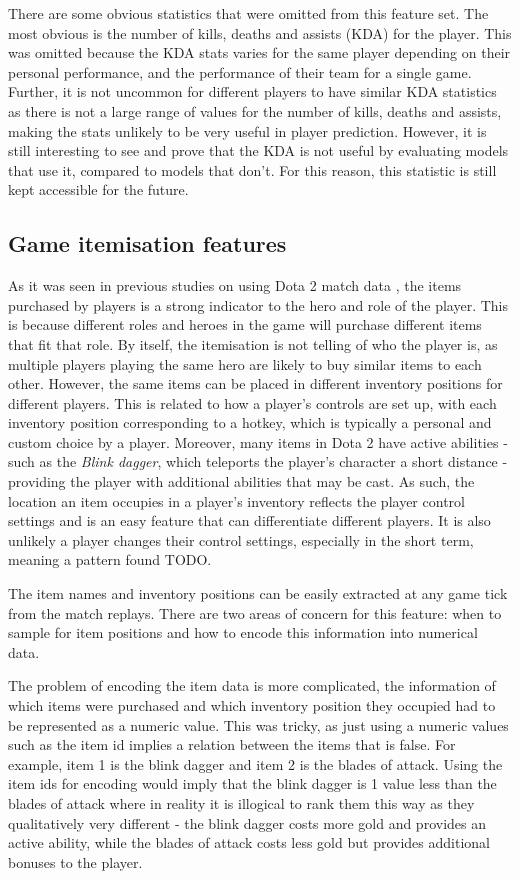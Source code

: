 \documentclass[Report.tex]{subfiles}
\begin{document}
There are some obvious statistics that were omitted from this feature set. The most obvious is the number of kills, deaths and assists (KDA) for the player. This was omitted because the KDA stats varies for the same player depending on their personal performance, and the performance of their team for a single game. Further, it is not uncommon for different players to have similar KDA statistics as there is not a large range of values for the number of kills, deaths and assists, making the stats unlikely to be very useful in player prediction. However, it is still interesting to see and prove that the KDA is not useful by evaluating models that use it, compared to models that don't. For this reason, this statistic is still kept accessible for the future. 


\subsection{Game itemisation features}
As it was seen in previous studies on using Dota 2 match data \cite{dota-gao, dota-eggert}, the items purchased by players is a strong indicator to the hero and role of the player. This is because different roles and heroes in the game will purchase different items that fit that role. By itself, the itemisation is not telling of who the player is, as multiple players playing the same hero are likely to buy similar items to each other. However, the same items can be placed in different inventory positions for different players. This is related to how a player's controls are set up, with each inventory position corresponding to a hotkey, which is typically a personal and custom choice by a player. Moreover, many items in Dota 2 have active abilities - such as the \textit{Blink dagger}, which teleports the player's character a short distance - providing the player with additional abilities that may be cast. As such, the location an item occupies in a player's inventory reflects the player control settings and is an easy feature that can differentiate different players. It is also unlikely a player changes their control settings, especially in the short term, meaning a pattern found TODO. 

The item names and inventory positions can be easily extracted at any game tick from the match replays. There are two areas of concern for this feature: when to sample for item positions and how to encode this information into numerical data. 

The problem of encoding the item data is more complicated, the information of which items were purchased and which inventory position they occupied had to be represented as a numeric value. This was tricky, as just using a numeric values such as the item id implies a relation between the items that is false. For example, item 1 is the blink dagger and item 2 is the blades of attack. Using the item ids for encoding would imply that the blink dagger is 1 value less than the blades of attack where in reality it is illogical to rank them this way as they qualitatively very different - the blink dagger costs more gold and provides an active ability, while the blades of attack costs less gold but provides additional bonuses to the player. 
\end{document}
